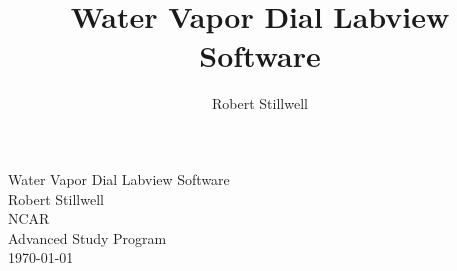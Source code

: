 \documentclass{article} %
\title{Water Vapor Dial Labview Software}
\author{Robert Stillwell}
\begin{document}
                    
\begin{center}
{\sc \LARGE Water Vapor Dial Labview Software} \\
\vspace{0.25in}
{\sc \Large Robert Stillwell\\}
\vspace{0.5in}
{\large NCAR
\\Advanced Study Program
\\ \today}
\end{center}
\vspace{0.5in}
\thispagestyle{empty}

\newpage                               	%
\tableofcontents                     	%
\thispagestyle{empty}		%
\newpage      				%
\setcounter{page}{1}            	%


















\end{document}
